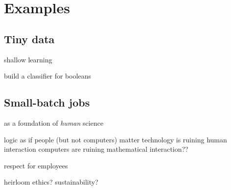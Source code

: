 \documentclass[10pt]{article}
\begin{document}
\section{Examples}

\subsection{Tiny data}

shallow learning

build a classifier for booleans

\subsection{Small-batch jobs}

\vspace{10em}

as a foundation of \emph{human} science

logic as if people (but not computers) matter
technology is ruining human interaction
computers are ruining mathematical interaction??

respect for employees

heirloom
ethics?
sustainability?

{}

\end{document}
